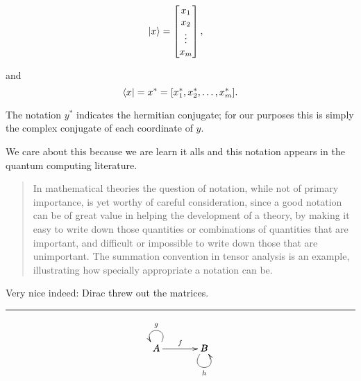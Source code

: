 \documentclass{article}
\begin{document}
\begin{align}
  \ket{x} &= \begin{bmatrix}
   x_{1} \\
   x_{2} \\
    \vdots \\
    x_{m}
  \end{bmatrix},
\end{align}

and
\begin{equation}
  \bra{x} = x^* = [x_1^*, x_2^*, \ldots, x_m^*].
\end{equation}

The notation $y^*$ indicates the hermitian conjugate; for our
purposes this is simply the complex conjugate of each coordinate
of $y$.

We care about this because we are learn it alls and this notation
appears in the quantum computing literature.

\begin{quote}
  In mathematical theories the question of notation, while not of primary
  importance, is yet worthy of careful consideration, since a good notation can
  be of great value in helping the development of a theory, by making it easy
  to write down those quantities or combinations of quantities that are
  important, and difficult or impossible to write down those that are
  unimportant. The summation convention in tensor analysis is an example,
  illustrating how specially appropriate a notation can be.\cite{dirac_1939}
\end{quote}

Very nice indeed: Dirac threw out the matrices.


\vspace{0.5in}

\hrule

$$
\bfig
\morphism[A`B;f]
\Loop(0,0)A(ur,ul)_g
\Loop(500,0)B(dl,dr)_h
\efig
$$

{}

\end{document}
